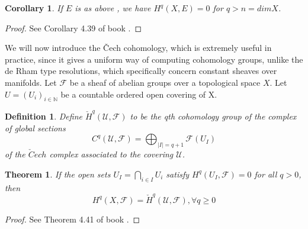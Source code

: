 \documentclass{article}
\numberwithin{equation}{subsection} %
\newtheorem{defi}{Definition}[section]
\newtheorem{thm}{Theorem}[section]
\newtheorem{coro}{Corollary}[section]
\theoremstyle{definition}
\begin{document}
\begin{coro}
If $E$ is as above , we have $H^q(X,E)=0$ for $q>n=dim X$.
\end{coro}
\begin{proof}
	See Corollary 4.39 of book \cite{voisin}.
\end{proof}
We will now introduce the \v{C}ech cohomology, which is extremely useful in 
practice, since it gives a uniform way of computing cohomology groups, unlike
the de Rham type resolutions, which specifically concern constant sheaves over
manifolds. Let $\mathcal{F}$  be a sheaf of abelian groups over a topological space $X$. Let $U=(U_i)_{i\in \mathbb{N}}$ be a countable ordered open covering of X.

\begin{defi}
Define $\check{H}^q(\mathcal{U} ,\mathcal{F})$ to be the qth cohomology group of the complex of global sections
$$C^q(\mathcal{U} ,\mathcal{F})=\bigoplus_{|I|=q+1} \mathcal{F}(U_I)$$
of the $\check{C}ech$ complex associated to the covering $\mathcal{U}$.
\end{defi}

\begin{thm}
If the open sets $U_I=\bigcap_{i\in I} U_i$ satisfy $H^q(U_I,\mathcal{F})=0$ for all $q>0$, then
$$H^q(X,\mathcal{F})=\check{H}^q(\mathcal{U},\mathcal{F}) , \forall q\ge 0$$
\end{thm}
\begin{proof}
	See Theorem 4.41 of book \cite{voisin}.
\end{proof}
\end{document}
